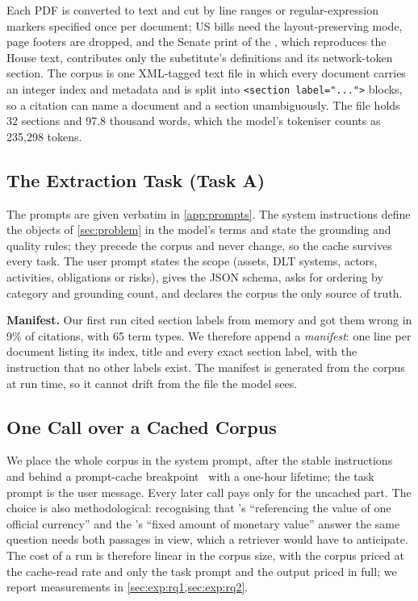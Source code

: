 Each PDF is converted to text and cut by line ranges or regular-expression
markers specified once per document; US bills need the layout-preserving mode,
page footers are dropped, and the Senate print of the , which
reproduces the House text, contributes only the substitute's definitions and
its network-token section. The corpus is one XML-tagged text file in which every document carries an
integer index and metadata and is split into \texttt{<section label="...">}
blocks, so a citation can name a document and a section unambiguously. The file
holds 32 sections and 97.8 thousand words, which the model's tokeniser counts
as 235,298 tokens.

\subsection{The Extraction Task (Task A)}
\label{sec:method:task}


The prompts are given verbatim in \cref{app:prompts}. The system instructions
define the objects of \cref{sec:problem} in the model's terms and state the grounding and quality
rules; they precede the corpus and never change, so the cache survives every
task. The user prompt states the scope (assets, DLT systems, actors, activities,
obligations or risks), gives the JSON schema, asks for ordering by category
and grounding count, and declares the corpus the only source of truth.

\textbf{Manifest.} Our first run cited section labels from memory and got
them wrong in 9\% of citations, with 65 term types. We therefore append a
\emph{manifest}: one line per document listing its index, title and every
exact section label, with the instruction that no other labels exist. The
manifest is generated from the corpus at run time, so it cannot drift from the
file the model sees.

\subsection{One Call over a Cached Corpus}
\label{sec:method:run}

We place the whole corpus in the system prompt, after the stable instructions
and behind a prompt-cache breakpoint~\cite{gim2024promptcache} with a one-hour lifetime; the task prompt
is the user message. Every later call pays only for the uncached part. The choice is also methodological:
recognising that 's ``referencing the value of one official
currency'' and the 's ``fixed amount of monetary value'' answer
the same question needs both passages in view, which a retriever would have to
anticipate. The cost of a run is therefore linear in the
corpus size, with the corpus priced at the cache-read rate and only the task
prompt and the output priced in full; we report measurements in
\cref{sec:exp:rq1,sec:exp:rq2}.

